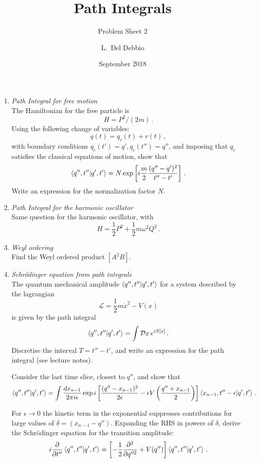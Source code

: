 \documentclass{tutorial}
\subtitle{Problem Sheet 2}
\title{Path Integrals}
\author{L.~Del Debbio}
\date{September 2018}
\begin{document}
\maketitle

\begin{enumerate}
  \item \emph{ Path Integral for free motion}\\

    The Hamiltonian for the free particle is 
    \[
      H = P^2/(2m)\, .
    \]
    Using the following change of variables:
    \[
      q(t) = q_c(t) + r(t)\, ,
    \]
    with boundary conditions $q_c(t')=q', q_c(t'')=q''$, and imposing
    that $q_c$ satisfies the classical equations of motion, show that
    \[
      \braket{q'',t''}{q',t'}=N \exp\left[i \frac{m}{2}
        \frac{(q''-q')^2}{t''-t'}\right]\, .
    \]
    Write an expression for the normalization factor $N$. 

    \bigskip

  \item \emph{ Path Integral for the harmonic oscillator} \\

    Same question for the harmonic oscillator, with 
    \[
      H = \frac12 P^2 + \frac12 m \omega^2 Q^2\, .
    \]

    \bigskip

  \item \emph{ Weyl ordering}\\

    Find the Weyl ordered product $[A^2 B]$.

    \bigskip

  \item \emph{ Schr\"odinger equation from path integrals}\\
    
    The quantum mechanical amplitude $\braket{q'',t''}{q',t'}$ for a
    system described by the lagrangian
    \[
      \mathcal{L} = \frac12 m \dot{x}^2 - V(x)
    \]
    is given by the path integral
    \[
      \braket{q'',t''}{q',t'} = \int \mathcal{D}x\, e^{i S[x]}\, .
    \]
    Discretise the interval $T=t''-t'$, and write an expression for
    the path integral (see lecture notes). 
    
    Consider the last time slice, closest to $q''$, and show that
    \[
      \braket{q'',t''}{q',t'} = \int \frac{dx_{n-1}}{2\pi i \epsilon} 
      \exp i \left[ 
        \frac{(q''-x_{n-1})^2}{2\epsilon} - \epsilon V\left(\frac{q''+x_{n-1}}{2}\right)
      \right]
       \braket{x_{n-1},t''-\epsilon}{q',t'}\, .
    \]
    
    For $\epsilon\to 0$ the kinetic term in the exponential suppresses
    contributions for large values of $\delta=(x_{n-1}-q'')$. Expanding the
    RHS in powers of $\delta$, derive the Schr\"odinger equation for
    the transition amplitude: 
    \[
      i \frac{\partial}{\partial t''} \braket{q'',t''}{q',t'} = 
      \left[-\frac12 \frac{\partial^2}{\partial q''^2} + V(q'') \right]
      \braket{q'',t''}{q',t'}\, .
    \]
    
    
\end{enumerate}
\end{document}
